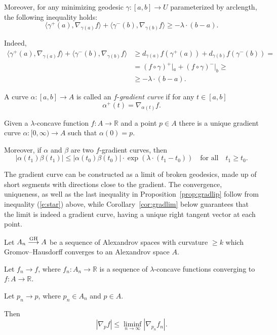 \documentclass{amsart}
\begin{document}
Moreover, for any minimizing geodesic $\gamma\colon  [a,b]\to U$
parameterized by arclength, the following inequality holds:
\begin{equation}\label{e:star}
\langle \gamma^+(a),\nabla_{\gamma(a)} f\rangle +\langle\gamma^-(b),\nabla_{\gamma(b)} f\rangle
\ge -\lambda{\cdot} (b-a) .
\end{equation}

Indeed,
\begin{align*}
\langle   \gamma^+(a),  \nabla_{\gamma(a)}  f   \rangle +
\langle  \gamma^-(b),   \nabla_{\gamma(b)} f  \rangle
&\ge
d_{\gamma(a)}f(\gamma^+(a))+d_{\gamma(b)}f(\gamma^-(b))
=
\\
&=
(f\circ\gamma)^+|_a+(f\circ\gamma)^-|_b\ge
\\
&\ge -\lambda{\cdot} (b-a).
\end{align*}

\begin{defn}A curve $\alpha\colon [a,b] \rightarrow A$ is called an $f$-\emph{gradient curve} if for any $t\in [a,b]$
$$\alpha^+(t)=\nabla_{\alpha(t)}f.$$
\end{defn}

\begin{prop}\label{prop:gradlip} Given a $\lambda$-concave function $f\colon A \rightarrow \mathbb{R}$ and a point $p\in A$ there is a unique gradient curve $\alpha\colon [0,\infty) \rightarrow A$ such that $\alpha(0)=p$.

Moreover, if $\alpha$ and $\beta$ are two $f$-gradient curves, then
$$|\alpha(t_1)\beta(t_1)|\le |\alpha(t_0)\beta(t_0)|{\cdot} \exp(\lambda{\cdot}  (t_1-t_0))
\quad\text{for all}\quad
t_1\ge t_0.$$

\end{prop}

The gradient curve  can be constructed as a limit of broken geodesics,
made up of short segments with directions close to the gradient.
The convergence, uniqueness, as well as the last inequality
in Proposition~\ref{prop:gradlip}
follow from
inequality (\ref{e:star}) above, while Corollary~\ref{cor:gradlim}
below guarantees that the limit is indeed
a gradient curve, having a unique right tangent vector at each point.

\begin{lem}\label{lem:gradcon}
 Let $A_n \GHto A$ be a sequence of
Alexandrov spaces with curvature $\ge k$
which Gromov--Hausdorff converges to an Alexandrov space $A$.

Let $f_n\to f$, where $f_n\colon A_n\to \mathbb{R}$ is a sequence of $\lambda$-concave
functions converging to $f\colon A\to \mathbb{R}$.

Let $p_n\to p$,  where $p_n\in A_n$ and $p\in A$.

Then
$$|\nabla_p f|\le \liminf_{n\to \infty} |\nabla_{p_n} f_n|.$$
\end{lem}
\end{document}
